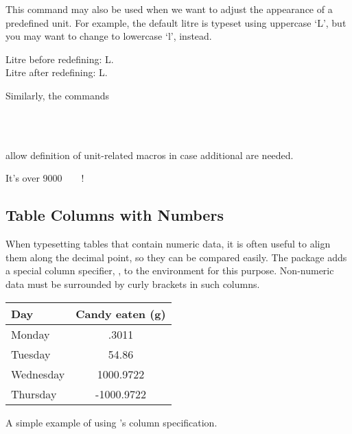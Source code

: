 This command may also be used when we want to adjust the appearance of a
predefined unit. For example, the default litre is typeset using uppercase
\enquote*{L}, but you may want to change to lowercase \enquote*{l}, instead.
\begin{example}
Litre before redefining:
\unit{\L}. \\
Litre after redefining:
\unit{\L}.
\end{example}

Similarly, the commands
\begin{lscommand}
      \\
       \\
\end{lscommand}
allow definition of unit-related macros in case additional are needed.
\begin{example}[examplewidth=0.8\linewidth, vertical_mode]

It's over \qty{9000}{\quartic\decakilo\pt\polymer}!
\end{example}

\subsection{Table Columns with Numbers}\label{sec:sitables}

When typesetting tables that contain numeric data, it is often useful to align
them along the decimal point, so they can be compared easily. The 
package adds a special column specifier, , to the 
environment for this purpose. Non-numeric data must be surrounded by curly
brackets in such columns.
\begin{listing}
  \begin{example}[examplewidth=0.7\linewidth, vertical_mode]
\begin{tabular}{@{}lS@{}}
  \toprule
  Day       & {Candy eaten (\unit{\g})} \\
  \midrule
  Monday    & .3011                     \\
  Tuesday   & 54.86                     \\
  Wednesday & 1000.9722                 \\
  Thursday  & -1000.9722                \\
  \bottomrule
\end{tabular}
\end{example}
  \caption{A simple example of using 's  column
    specification.}
\end{listing}

